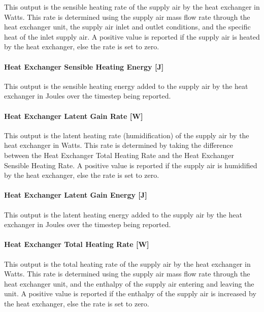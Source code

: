 This output is the sensible heating rate of the supply air by the heat exchanger in Watts. This rate is determined using the supply air mass flow rate through the heat exchanger unit, the supply air inlet and outlet conditions, and the specific heat of the inlet supply air. A positive value is reported if the supply air is heated by the heat exchanger, else the rate is set to zero.

\paragraph{Heat Exchanger Sensible Heating Energy {[}J{]}}\label{heat-exchanger-sensible-heating-energy-j-1}

This output is the sensible heating energy added to the supply air by the heat exchanger in Joules over the timestep being reported.

\paragraph{Heat Exchanger Latent Gain Rate {[}W{]}}\label{heat-exchanger-latent-gain-rate-w-1}

This output is the latent heating rate (humidification) of the supply air by the heat exchanger in Watts. This rate is determined by taking the difference between the Heat Exchanger Total Heating Rate and the Heat Exchanger Sensible Heating Rate. A positive value is reported if the supply air is humidified by the heat exchanger, else the rate is set to zero.

\paragraph{Heat Exchanger Latent Gain Energy {[}J{]}}\label{heat-exchanger-latent-gain-energy-j}

This output is the latent heating energy added to the supply air by the heat exchanger in Joules over the timestep being reported.

\paragraph{Heat Exchanger Total Heating Rate {[}W{]}}\label{heat-exchanger-total-heating-rate-w-1}

This output is the total heating rate of the supply air by the heat exchanger in Watts. This rate is determined using the supply air mass flow rate through the heat exchanger unit, and the enthalpy of the supply air entering and leaving the unit. A positive value is reported if the enthalpy of the supply air is increased by the heat exchanger, else the rate is set to zero.

